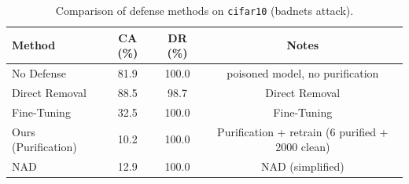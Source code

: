 \begin{table}[htbp]
\centering
\caption{Comparison of defense methods on \texttt{cifar10} (badnets attack).}
\label{tab:results}
\begin{tabular}{lccc}
\toprule
Method & CA (\%) & DR (\%) & Notes \\
\midrule
  No Defense & 81.9 & 100.0 & poisoned model, no purification \\
  Direct Removal & 88.5 & 98.7 & Direct Removal \\
  Fine-Tuning & 32.5 & 100.0 & Fine-Tuning \\
  Ours (Purification) & 10.2 & 100.0 & Purification + retrain (6 purified + 2000 clean) \\
  NAD & 12.9 & 100.0 & NAD (simplified) \\
\bottomrule
\end{tabular}
\end{table}